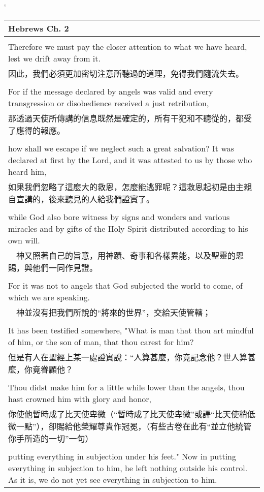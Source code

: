\documentclass{book}
\begin{document}
\newpage
`
\begin{tabularx}{\textwidth}{p{}}
\hline
Hebrews Ch. 2 \\
\hline \\
Therefore we must pay the closer attention to what we have heard, lest we drift away from it. \\
因此，我們必須更加密切注意所聽過的道理，免得我們隨流失去。 \\ \\
For if the message declared by angels was valid and every transgression or disobedience received a just retribution, \\
那透過天使所傳講的信息既然是確定的，所有干犯和不聽從的，都受了應得的報應。 \\ \\
how shall we escape if we neglect such a great salvation? It was declared at first by the Lord, and it was attested to us by those who heard him, \\
如果我們忽略了這麼大的救恩，怎麼能逃罪呢？這救恩起初是由主親自宣講的，後來聽見的人給我們證實了。 \\ \\
while God also bore witness by signs and wonders and various miracles and by gifts of the Holy Spirit distributed according to his own will. \\
　神又照著自己的旨意，用神蹟、奇事和各樣異能，以及聖靈的恩賜，與他們一同作見證。 \\ \\
For it was not to angels that God subjected the world to come, of which we are speaking. \\
　神並沒有把我們所說的“將來的世界”，交給天使管轄； \\ \\
It has been testified somewhere, "What is man that thou art mindful of him, or the son of man, that thou carest for him? \\
但是有人在聖經上某一處證實說：“人算甚麼，你竟記念他？世人算甚麼，你竟眷顧他？ \\ \\
Thou didst make him for a little while lower than the angels, thou hast crowned him with glory and honor, \\
你使他暫時成了比天使卑微（“暫時成了比天使卑微”或譯“比天使稍低微一點”），卻賜給他榮耀尊貴作冠冕，（有些古卷在此有“並立他統管你手所造的一切”一句） \\ \\
putting everything in subjection under his feet." Now in putting everything in subjection to him, he left nothing outside his control. As it is, we do not yet see everything in subjection to him. \\

\end{tabularx}
\end{document}
